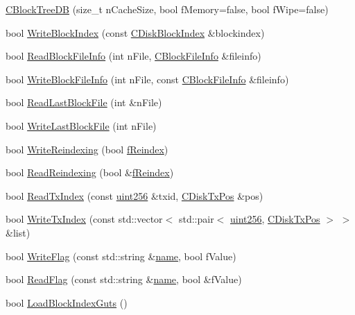 \begin{DoxyCompactItemize}
\item 
\hyperlink{class_c_block_tree_d_b_a52fd1b1dc02c2a4e977099e2c2c50424}{C\+Block\+Tree\+D\+B} (size\+\_\+t n\+Cache\+Size, bool f\+Memory=false, bool f\+Wipe=false)
\item 
bool \hyperlink{class_c_block_tree_d_b_a608a04a08445d95e477cb66889c679d0}{Write\+Block\+Index} (const \hyperlink{class_c_disk_block_index}{C\+Disk\+Block\+Index} \&blockindex)
\item 
bool \hyperlink{class_c_block_tree_d_b_a6f951198dc53fbe9194626ff82638656}{Read\+Block\+File\+Info} (int n\+File, \hyperlink{class_c_block_file_info}{C\+Block\+File\+Info} \&fileinfo)
\item 
bool \hyperlink{class_c_block_tree_d_b_ae248032ee1f1303dea54a0b36ad84755}{Write\+Block\+File\+Info} (int n\+File, const \hyperlink{class_c_block_file_info}{C\+Block\+File\+Info} \&fileinfo)
\item 
bool \hyperlink{class_c_block_tree_d_b_adb1276fe2f0e0c4c106660948c581711}{Read\+Last\+Block\+File} (int \&n\+File)
\item 
bool \hyperlink{class_c_block_tree_d_b_ae1f4ea54edf05a056d2da00ea90a9394}{Write\+Last\+Block\+File} (int n\+File)
\item 
bool \hyperlink{class_c_block_tree_d_b_a8fa5d150b98f4fd1aa8cf503eddfccef}{Write\+Reindexing} (bool \hyperlink{main_8h_a8e0eca589b2d4254a65f04c5d91888b2}{f\+Reindex})
\item 
bool \hyperlink{class_c_block_tree_d_b_a1abf6fc392048428aa24a12b7942824b}{Read\+Reindexing} (bool \&\hyperlink{main_8h_a8e0eca589b2d4254a65f04c5d91888b2}{f\+Reindex})
\item 
bool \hyperlink{class_c_block_tree_d_b_a74383427266d627e84c2d0c8e21e03c7}{Read\+Tx\+Index} (const \hyperlink{classuint256}{uint256} \&txid, \hyperlink{class_c_disk_tx_pos}{C\+Disk\+Tx\+Pos} \&pos)
\item 
bool \hyperlink{class_c_block_tree_d_b_a1e03745f9675ad352a1483a0aa7ef308}{Write\+Tx\+Index} (const std\+::vector$<$ std\+::pair$<$ \hyperlink{classuint256}{uint256}, \hyperlink{class_c_disk_tx_pos}{C\+Disk\+Tx\+Pos} $>$ $>$ \&list)
\item 
bool \hyperlink{class_c_block_tree_d_b_af2f65b70ac5d8a198d4f29a7e909c08a}{Write\+Flag} (const std\+::string \&\hyperlink{testharness_8cc_a8f8f80d37794cde9472343e4487ba3eb}{name}, bool f\+Value)
\item 
bool \hyperlink{class_c_block_tree_d_b_acd779c4653fd9a87fffe95d53ce7c6d3}{Read\+Flag} (const std\+::string \&\hyperlink{testharness_8cc_a8f8f80d37794cde9472343e4487ba3eb}{name}, bool \&f\+Value)
\item 
bool \hyperlink{class_c_block_tree_d_b_a12be19bb1d7253eeb40e1aa88b032346}{Load\+Block\+Index\+Guts} ()
\end{DoxyCompactItemize}


